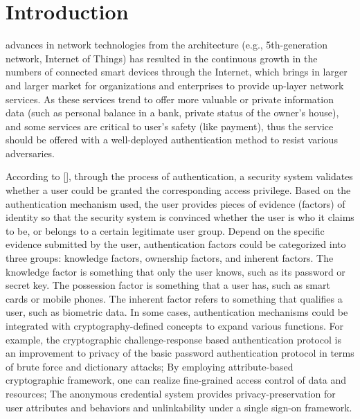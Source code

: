 \section{Introduction}

 advances in network technologies from the architecture (e.g., 5th-generation network, Internet of Things) has resulted in the continuous growth in the numbers of connected smart devices through the Internet, which brings in larger and larger market for organizations and enterprises to provide up-layer network services. As these services trend to offer more valuable or private information data (such as personal balance in a bank, private status of the owner's house), and some services are critical to user's safety (like payment), thus the service should be offered with a well-deployed authentication method to resist various adversaries.

According to [], through the process of authentication, a security system validates whether a user could be granted the corresponding access privilege. Based on the authentication mechanism used, the user provides pieces of evidence (factors) of identity so that the security system is convinced whether the user is who it claims to be, or belongs to a certain legitimate user group. Depend on the specific evidence submitted by the user, authentication factors could be categorized into three groups: knowledge factors, ownership factors, and inherent factors. The knowledge factor is something that only the user knows, such as its password or secret key. The possession factor is something that a user has, such as smart cards or mobile phones. The inherent factor refers to something that qualifies a user, such as biometric data. 
In some cases, authentication mechanisms could be integrated with cryptography-defined concepts to expand various functions. For example, the cryptographic challenge-response based authentication protocol is an improvement to privacy of the basic password authentication protocol in terms of brute force and dictionary attacks; By employing attribute-based cryptographic framework, one can realize fine-grained access control of data and resources; The anonymous credential system provides privacy-preservation for user attributes and behaviors and unlinkability under a single sign-on framework. 

